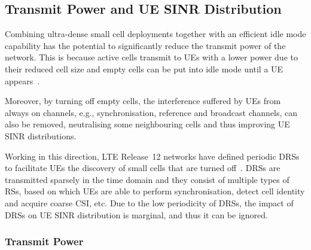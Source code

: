 \documentclass{IEEEtran}
\begin{document}
\begin{figure*}[t]
  \centering
  \caption{UE SINR CDF of several ultra-dense small cell deployments
  with \ac{ISD} among small cell \acp{BS} of 200, 100, 75, 50, 35, 20, 10 and 5\,m
  with or without idle mode capabilities.
  The rest of the parameters are $d=300$\,UE/km$^2$, $ud$=1, $s=1$, $f=2$\,GHz, $a=1$ and $t=$12\,dB.}
  \label{fig:sinrCDF}
\end{figure*}

\subsection{Transmit Power and \ac{UE} \ac{SINR} Distribution}

Combining ultra-dense small cell deployments together with an efficient idle mode capability
has the potential to significantly reduce the transmit power of the network.
This is because active cells transmit to \acp{UE} with a lower power due to their reduced cell size
and empty cells can be put into idle mode until a \ac{UE} appears~\cite{Ashraf:10a}.

Moreover, by turning off empty cells,
the interference suffered by \acp{UE} from always on channels, e.g., synchronisation, reference and broadcast channels,
can also be removed,
neutralising some neighbouring cells and thus improving  \ac{UE} \ac{SINR} distributions.


Working in this direction,
\ac{LTE} Release~12 networks have defined
periodic \acp{DRS} to facilitate \acp{UE} the discovery of small cells that are turned off~\cite{LTE-R12}.
\acp{DRS} are transmitted sparsely in the time domain and they consist of multiple types of \acp{RS},
based on which \acp{UE} are able to perform synchronisation, detect cell identity and acquire coarse \ac{CSI}, etc.
Due to the low periodicity of \acp{DRS},
the impact of \acp{DRS} on \ac{UE} \ac{SINR} distribution is marginal, and thus it can be ignored.


\subsubsection{Transmit Power}
\end{document}
